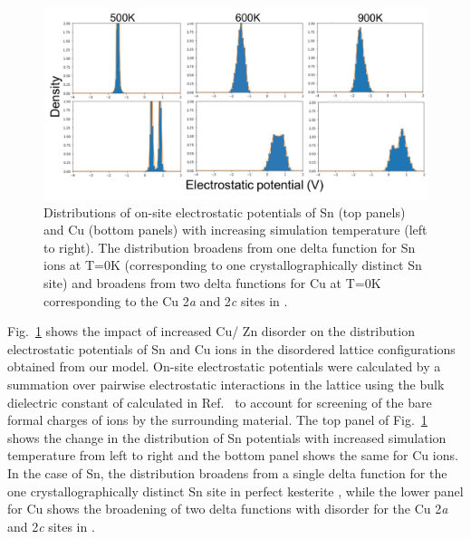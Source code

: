 \documentclass[11pt, twoside]{report}
\begin{document}
\begin{figure}[]
  \centering
    \includegraphics[width=1.0\textwidth]{figures/pot_dists.png}
    \caption{Distributions of on-site electrostatic potentials of Sn (top panels) and Cu (bottom panels) with increasing simulation temperature (left to right). The distribution broadens from one delta function for Sn ions at T=0K (corresponding to one crystallographically distinct Sn site) and broadens from two delta functions for Cu at T=0K corresponding to the Cu 2\textit{a} and 2\textit{c} sites in {\CZTS}.}
  \label{pot_dists}
\end{figure}

Fig.~\ref{pot_dists} shows the impact of increased Cu/ Zn disorder on the distribution electrostatic potentials of Sn and Cu ions in the disordered lattice configurations obtained from our model. 
On-site electrostatic potentials were calculated by a summation over pairwise electrostatic interactions in the lattice using the bulk dielectric constant of {\CZTS} calculated in Ref.~\cite{Sunghyun_dielectric} to account for screening of the bare formal charges of ions by the surrounding material.
The top panel of Fig.~\ref{pot_dists} shows the change in the distribution of Sn potentials with increased simulation temperature from left to right and the bottom panel shows the same for Cu ions. In the case of Sn, the distribution broadens from a single delta function for the one crystallographically distinct Sn site in perfect kesterite {\CZTS}, while the lower panel for Cu shows the broadening of two delta functions with disorder for the Cu 2\textit{a} and 2\textit{c} sites in {\CZTS}.



\end{document}
